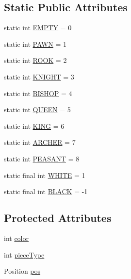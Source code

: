\subsection*{Static Public Attributes}
\begin{DoxyCompactItemize}
\item 
static int \hyperlink{classpieces_1_1_piece_a5d79a14b2b47d6699449dd3e015f0392}{E\-M\-P\-T\-Y} = 0
\item 
static int \hyperlink{classpieces_1_1_piece_a625b30e964a9962f2909525a6da66467}{P\-A\-W\-N} = 1
\item 
static int \hyperlink{classpieces_1_1_piece_abd3221f0cd505d49ca331c79264cb16f}{R\-O\-O\-K} = 2
\item 
static int \hyperlink{classpieces_1_1_piece_a594fad243368a3532079b3705fb18c00}{K\-N\-I\-G\-H\-T} = 3
\item 
static int \hyperlink{classpieces_1_1_piece_a61cc411a0431bb85a06365792d051a16}{B\-I\-S\-H\-O\-P} = 4
\item 
static int \hyperlink{classpieces_1_1_piece_a6bf04fb81c4004dbdf7ffe388d0d5709}{Q\-U\-E\-E\-N} = 5
\item 
static int \hyperlink{classpieces_1_1_piece_a21aac8b997842296b02cc95dc7caf482}{K\-I\-N\-G} = 6
\item 
static int \hyperlink{classpieces_1_1_piece_a63587ad284faac66495ede78b2c835d2}{A\-R\-C\-H\-E\-R} = 7
\item 
static int \hyperlink{classpieces_1_1_piece_a096ca129d441937377c6303f8a9b47dd}{P\-E\-A\-S\-A\-N\-T} = 8
\item 
static final int \hyperlink{classpieces_1_1_piece_a06ca63ba013da56fa10ccde66da622c7}{W\-H\-I\-T\-E} = 1
\item 
static final int \hyperlink{classpieces_1_1_piece_ab569c22ea0d43da6e1e9e1722b7f41b1}{B\-L\-A\-C\-K} = -\/1
\end{DoxyCompactItemize}
\subsection*{Protected Attributes}
\begin{DoxyCompactItemize}
\item 
int \hyperlink{classpieces_1_1_piece_a1ceedc99f8855c1fca9839aa5a69db69}{color}
\item 
int \hyperlink{classpieces_1_1_piece_ae40d6201d0aed36f369dd9d8f55892e3}{piece\-Type}
\item 
Position \hyperlink{classpieces_1_1_piece_a9a3b5cf20c198c74a04cea615815b11c}{pos}
\end{DoxyCompactItemize}


